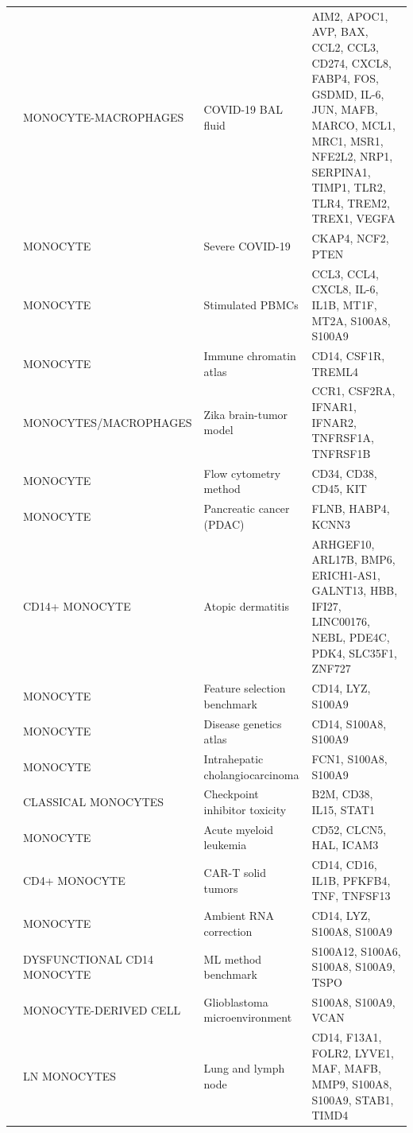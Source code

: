 \documentclass[10pt,twocolumn]{article}
\theoremstyle{plain}
\theoremstyle{definition}
\theoremstyle{remark}
\begin{document}
\begin{table}[ht!]
\begin{tabular}{@{}l p{3.6cm} p{2.7cm} p{7.1cm}@{}}
  \citep{Asaba2024} & MONOCYTE-MACROPHAGES & COVID-19 BAL fluid & AIM2, APOC1, AVP, BAX, CCL2, CCL3, CD274, CXCL8, FABP4, FOS, GSDMD, IL-6, JUN, MAFB, MARCO, MCL1, MRC1, MSR1, NFE2L2, NRP1, SERPINA1, TIMP1, TLR2, TLR4, TREM2, TREX1, VEGFA  \\ [4pt]
  \citep{Gavriilidis2024} & MONOCYTE & Severe COVID-19 & CKAP4, NCF2, PTEN  \\ [4pt]
  \citep{Lawlor2020} & MONOCYTE & Stimulated PBMCs & CCL3, CCL4, CXCL8, IL-6, IL1B, MT1F, MT2A, S100A8, S100A9  \\ [4pt]
  \citep{Satpathy2019} & MONOCYTE & Immune chromatin atlas & CD14, CSF1R, TREML4  \\ [4pt]
  \citep{Sherwood2024zika} & MONOCYTES/\allowbreak MACROPHAGES & Zika brain-tumor model & CCR1, CSF2RA, IFNAR1, IFNAR2, TNFRSF1A, TNFRSF1B  \\ [4pt]
  \citep{Shemonti2025} & MONOCYTE & Flow cytometry method & CD34, CD38, CD45, KIT  \\ [4pt]
  \citep{Xu2025pdac} & MONOCYTE & Pancreatic cancer (PDAC) & FLNB, HABP4, KCNN3  \\ [4pt]
  \citep{Baldonado2025biorxiv689843} & CD14+ MONOCYTE & Atopic dermatitis & ARHGEF10, ARL17B, BMP6, ERICH1-AS1, GALNT13, HBB, IFI27, LINC00176, NEBL, PDE4C, PDK4, SLC35F1, ZNF727  \\ [4pt]
  \citep{Alkhadrawi2025} & MONOCYTE & Feature selection benchmark & CD14, LYZ, S100A9  \\ [4pt]
  \citep{Yu2024hcnetlas} & MONOCYTE & Disease genetics atlas & CD14, S100A8, S100A9  \\ [4pt]
  \citep{Wang2025icc} & MONOCYTE & Intrahepatic cholangiocarcinoma & FCN1, S100A8, S100A9  \\ [4pt]
  \citep{Zhao2022biorxiv494592} & CLASSICAL MONOCYTES & Checkpoint inhibitor toxicity & B2M, CD38, IL15, STAT1  \\ [4pt]
  \citep{Li2021aml} & MONOCYTE & Acute myeloid leukemia & CD52, CLCN5, HAL, ICAM3  \\ [4pt]
  \citep{Luo2025biorxiv676755} & CD4+ MONOCYTE & CAR-T solid tumors & CD14, CD16, IL1B, PFKFB4, TNF, TNFSF13  \\ [4pt]
  \citep{Yang2019decontx} & MONOCYTE & Ambient RNA correction & CD14, LYZ, S100A8, S100A9  \\ [4pt]
  \citep{Jeong2025biorxiv632256} & DYSFUNCTIONAL CD14 MONOCYTE & ML method benchmark & S100A12, S100A6, S100A8, S100A9, TSPO  \\ [4pt]
  \citep{Cheng2024glio} & MONOCYTE-DERIVED CELL & Glioblastoma microenvironment & S100A8, S100A9, VCAN  \\ [4pt]
  \citep{Leach2020biorxiv070839} & LN MONOCYTES & Lung and lymph node & CD14, F13A1, FOLR2, LYVE1, MAF, MAFB, MMP9, S100A8, S100A9, STAB1, TIMD4  \\ [4pt]
  \bottomrule
  \end{tabular}
\end{table}
\end{document}
